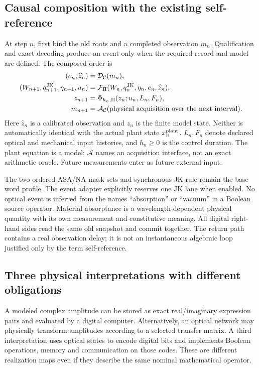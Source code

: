 \subsection{Causal composition with the existing self-reference}
At step $n$, first bind the old roots and a completed observation $m_n$.
Qualification and exact decoding produce an event only when the required
record and model are defined. The composed order is
\begin{align}
 (e_n,\widehat z_n)&=\mathcal D_{\mathcal C}(m_n),\\
 (W_{n+1},q_{n+1}^{\rm JK},\eta_{n+1},u_n)
     &=\mathcal F_{\Pi}(W_n,q_n^{\rm JK},\eta_n,e_n,\widehat z_n),\\
 z_{n+1}&=\Phi_{h_n,\Pi}(z_n;u_n,L_n,F_n),\\
 m_{n+1}&=\mathcal A_{\mathcal C}(\text{physical acquisition over the next interval}).
\end{align}
Here $\widehat z_n$ is a calibrated observation and $z_n$ is the finite model
state. Neither is automatically identical with the actual plant state
$x_n^{\rm plant}$. $L_n,F_n$ denote declared optical and mechanical
input histories, and $h_n\ge0$ is the control duration. The plant equation is
a model; $\mathcal A$ names an acquisition interface, not an exact arithmetic
oracle. Future measurements enter as future external input.

The two ordered ASA/NA mask sets and synchronous JK rule remain the base
word profile. The event adapter explicitly reserves one JK lane when enabled.
No optical event is inferred from the names ``absorption'' or ``vacuum'' in
a Boolean source operator. Material absorptance is a wavelength-dependent
physical quantity with its own measurement and constitutive meaning.
All digital right-hand sides read the same old snapshot and commit together.
The return path contains a real observation delay; it is not an instantaneous
algebraic loop justified only by the term self-reference.

\subsection{Three physical interpretations with different obligations}
A modeled complex amplitude can be stored as exact real/imaginary expression
pairs and evaluated by a digital computer. Alternatively, an optical network
may physically transform amplitudes according to a selected transfer matrix.
A third interpretation uses optical states to encode digital bits and implements
Boolean operations, memory and communication on those codes. These are different
realization maps even if they describe the same nominal mathematical operator.

